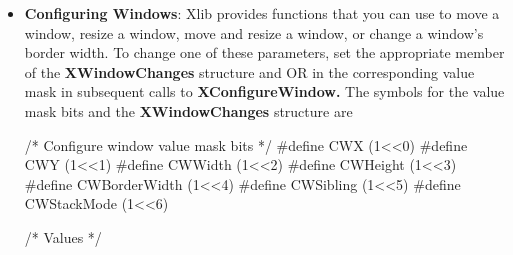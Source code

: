 \documentclass{report}
\begin{document}
\begin{itemize}
            \bigbreak \noindent 
            \textbf{XUnmapWindow} can generate a \textbf{BadWindow} error.
            \bigbreak \noindent 
            To unmap all subwindows for a specified window, use \textbf{XUnmapSubwindows}
            \bigbreak \noindent 
            \begin{cppcode}
                XUnmapSubwindows (display, w)
            \end{cppcode}
            The \textbf{XUnmapSubwindows} function unmaps all subwindows for the specified window in bottom-to-top stacking order. It causes the X server to generate an \textbf{UnmapNotify} event on each subwindow and Expose events on formerly obscured windows. Using this function is much more efficient than unmapping multiple windows one at a time because the server needs to perform much of the work only once, for all of the windows, rather than for each window.
            \bigbreak \noindent 
            \textbf{XUnmapSubwindows} can generate a \textbf{BadWindow} error.
        \item \textbf{Configuring Windows}: Xlib provides functions that you can use to move a window, resize a window, move and resize a window, or change a window’s border width. To change one of these parameters, set the appropriate member of the \textbf{XWindowChanges} structure and OR in the corresponding value mask in subsequent calls to \textbf{XConfigureWindow.} The symbols for the value mask bits and the \textbf{XWindowChanges} structure are
            \bigbreak \noindent 
            \begin{cppcode}
                /* Configure window value mask bits */
                #define CWX                 (1<<0)
                #define CWY                 (1<<1)
                #define CWWidth             (1<<2)
                #define CWHeight            (1<<3)
                #define CWBorderWidth       (1<<4)
                #define CWSibling           (1<<5)
                #define CWStackMode         (1<<6)

                /* Values */


\end{cppcode}
\end{itemize}
\end{document}
